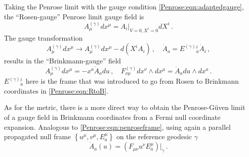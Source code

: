 Taking the Penrose limit with the gauge condition \eqref{Penrose:eqn:adaptedgauge}, the ``Rosen-gauge'' Penrose limit gauge field is
\begin{equation}\label{Penrose:eqn:ARosen}
A^{(\gamma)}_{\mu} dx^{\mu} = A_i|_{V=0, X^i=0}  dX^i  \, .
\end{equation}
The gauge transformation
\begin{equation}
A^{(\gamma)}_{\mu} dx^{\mu} \to A^{(\gamma)}_{\mu} dx^{\mu} - d( X^i A_i) \, , \quad \dot{A}_a = E^{(\gamma)}{}^i_a \dot{A}_i \, ,
\end{equation}
results in the ``Brinkmann-gauge'' field
\begin{equation}\label{Penrose:eqn:Abrinkmann}
A^{(\gamma)}_{\mu} dx^{\mu} = -x^a \dot{A}_a du \, , \quad  F^{(\gamma)}_{\nu \mu} dx^{\nu} \wedge dx^{\mu} =  \dot{A}_a du \wedge dx^a\, .
\end{equation}
$E^{(\gamma)}{}^i_a$ here is the frame that was introduced to go from Rosen to Brinkmann coordinates in \eqref{Penrose:eqn:RtoB}. 

As for the metric, there is a more direct way to obtain the Penrose-G\"uven limit of a gauge field in Brinkmann coordinates from a Fermi null coordinate expansion. Analogous to \eqref{Penrose:eqn:penroseframe}, using again a parallel propagated null frame $\left\lbrace u^{\mu}, v^{\mu}, E^{\mu}_a \right \rbrace$ on the reference geodesic $\gamma$
\begin{equation}\label{Penrose:eqn:penroseframeF}
\dot{A}_a(u) = \left(F_{\mu \nu} u^{\nu}  E^{\mu}_a \right)|_{\gamma} \, .
\end{equation}

